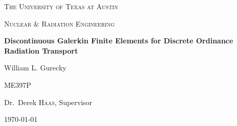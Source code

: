 
\begin{titlepage}
	\centering
	{\scshape\LARGE The University of Texas at Austin \par}
	\vspace{1cm}
	{\scshape\Large Nuclear \& Radiation Engineering \par}
	\vspace{1.5cm}
	{\huge\bfseries Discontinuous Galerkin Finite Elements for Discrete Ordinance Radiation Transport \par}
	\vspace{2cm}
	{\Large William L. Gurecky \par}
	\vfill

	\begin{flushright}
	ME397P \par
	\bigskip
	Dr.~Derek \textsc{Haas}, Supervisor \par
        \date{\today}
	\end{flushright}
	\vfill
	{\large \today\par}
\end{titlepage}
\pagebreak
\tableofcontents
\pagebreak
